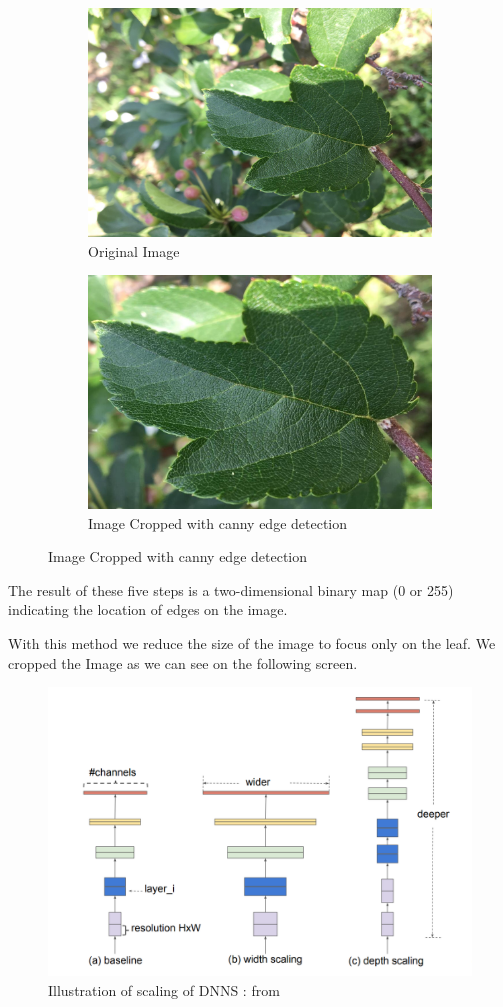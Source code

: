 \documentclass[a4paper]{article}
\begin{document}
\begin{itemize}
{}
\begin{figure}[H]
\centering
\begin{subfigure}{\textwidth}
  \centering
  \includegraphics[width=.4\linewidth]{images/Test_1023.jpg}
  \caption{Original Image}
  \label{fig:sub1}
\end{subfigure}%
\begin{subfigure}{\textwidth}
  \centering
  \includegraphics[width=.4\linewidth]{images/Test_1023_crpped.jpg}
  \caption{Image Cropped with canny edge detection}
  \label{fig:sub2}
\end{subfigure}
\label{fig:test}
\end{figure}

 
 
\end{itemize}
The result of these five steps is a two-dimensional binary map (0 or 255) indicating the location of edges on the image.

With this method we reduce the size of the image to focus only on the leaf. We cropped the Image as we can see on the following screen.






\begin{figure}[H]
      \includegraphics[width=\linewidth]{images/scaling.png}
      \caption{Illustration of scaling of DNNS : from \cite{DBLP:journals/corr/abs-1905-11946}}
      \label{fig:scaling}
\end{figure}
\end{document}
